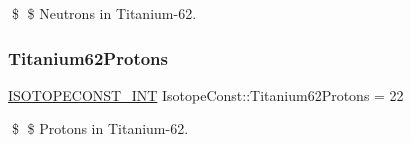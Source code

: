 \$ \$ Neutrons in Titanium-\/62. \mbox{\label{group___isotope_const-_titanium-_ti62_ga70481795c0f853069a8f6ed2c5c82282}} 
\subsubsection{\texorpdfstring{Titanium62\+Protons}{Titanium62Protons}}
{\footnotesize\ttfamily \mbox{\hyperlink{group___isotope_const-_macros_ga5f18360b3e99483a35c32d789e62621c}{I\+S\+O\+T\+O\+P\+E\+C\+O\+N\+S\+T\+\_\+\+I\+NT}} Isotope\+Const\+::\+Titanium62\+Protons = 22}

\$ \$ Protons in Titanium-\/62. 